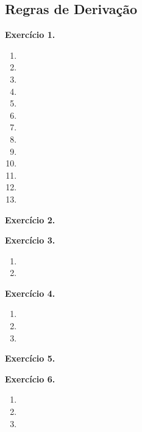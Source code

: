 \documentclass[12pt,a4paper]{article}
\begin{document}
\subsection{Regras de Derivação}

\vspace{0.5cm}
\noindent\textbf{Exercício 1.}
\begin{enumerate}
    \renewcommand{\theenumi}{\alph{enumi}}
    \renewcommand{\labelenumi}{\theenumi)}
    \item 
    \item 
    \item 
    \item 
    \item 
    \item 
    \item 
    \item 
    \item 
    \item 
    \item 
    \item 
    \item 
\end{enumerate}

\vspace{0.5cm}
\noindent\textbf{Exercício 2.}

\vspace{0.5cm}
\noindent\textbf{Exercício 3.}
\begin{enumerate}
    \renewcommand{\theenumi}{\alph{enumi}}
    \renewcommand{\labelenumi}{\theenumi)}
    \item 
    \item 
\end{enumerate}

\vspace{0.5cm}
\noindent\textbf{Exercício 4.}
\begin{enumerate}
    \renewcommand{\theenumi}{\alph{enumi}}
    \renewcommand{\labelenumi}{\theenumi)}
    \item 
    \item 
    \item 
\end{enumerate}

\vspace{0.5cm}
\noindent\textbf{Exercício 5.}

\vspace{0.5cm}
\noindent\textbf{Exercício 6.}
\begin{enumerate}
    \renewcommand{\theenumi}{\alph{enumi}}
    \renewcommand{\labelenumi}{\theenumi)}
    \item 
    \item 
    \item 
\end{enumerate}
\end{document}
